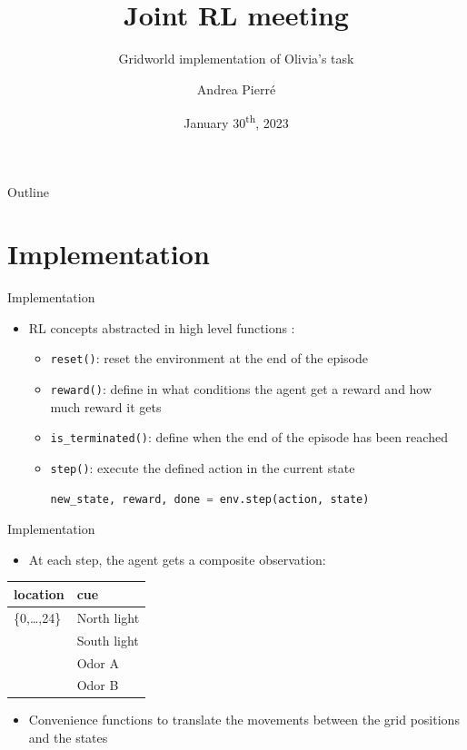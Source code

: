 \documentclass[bigger]{beamer}
\author{Andrea Pierré}
\date{January 30\textsuperscript{th}, 2023}
\title{Joint RL meeting}
\subtitle{Gridworld implementation of Olivia's task}
\institute{Brown University}
\begin{document}
\maketitle
\begin{frame}{Outline}
\tableofcontents
\end{frame}

\section{Implementation}
\label{sec:org931709c}
\begin{frame}[<+->][label={sec:org43a5470},fragile]{Implementation}
 \begin{itemize}
\item RL concepts abstracted in high level functions :
\begin{itemize}
\item \texttt{reset()}: reset the environment at the end of the episode
\item \texttt{reward()}: define in what conditions the agent get a reward and how much reward it gets
\item \texttt{is\_terminated()}: define when the end of the episode has been reached
\item \texttt{step()}: execute the defined action in the current state
\scriptsize
\begin{lstlisting}[language={Python}]
new_state, reward, done = env.step(action, state)
\end{lstlisting}
\end{itemize}
\end{itemize}
\end{frame}
\begin{frame}[<+->][label={sec:org154f7d3}]{Implementation}
\begin{itemize}
\item At each step, the agent gets a composite observation:
\end{itemize}
\begin{center}
\begin{tabular}{ll}
\hline
location & cue\\
\hline
\{0,\ldots{},24\} & North light\\
 & South light\\
 & Odor A\\
 & Odor B\\
\hline
\end{tabular}
\end{center}
\begin{itemize}
\item Convenience functions to translate the movements between the grid positions and the states
\end{itemize}
\end{frame}
\end{document}
